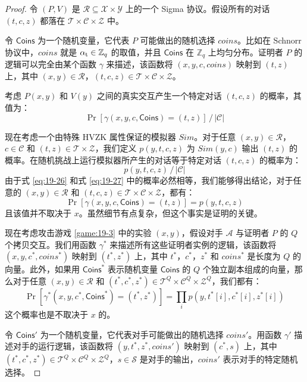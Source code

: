 \begin{proof}
令 $(P,V)$ 是 $\mathcal{R}\subseteq\mathcal{X}×\mathcal{Y}$ 上的一个 Sigma 协议。假设所有的对话 $(t,c,z)$ 都落在 $\mathcal{T}\times\mathcal{C}\times\mathcal{Z}$ 中。

令 $\mathsf{Coins}$ 为一个随机变量，它代表 $P$ 可能做出的随机选择 $coins$。比如在 Schnorr 协议中，$coins$ 就是 $\alpha_{\rm t}\in\mathbb{Z}_q$ 的取值，并且 $\mathsf{Coins}$ 在 $\mathbb{Z}_q$ 上均匀分布。证明者 $P$ 的逻辑可以完全由某个函数 $\gamma$ 来描述，该函数将 $(x,y,c,coins)$ 映射到 $(t,z)$ 上，其中 $(x,y)\in\mathcal{R}$，$(t,c,z)\in\mathcal{T}\times\mathcal{C}\times\mathcal{Z}$。

考虑 $P(x,y)$ 和 $V(y)$ 之间的真实交互产生一个特定对话 $(t,c,z)$ 的概率，其值为：
\begin{equation}\label{eq:19-26}
{\Pr[\gamma(x,y,c,\mathsf{Coins})=(t,z)]}\,/\,{|\mathcal{C}|}
\end{equation}


现在考虑一个由特殊 HVZK 属性保证的模拟器 $Sim$。对于任意 $(x,y)\in\mathcal{R}$，$c\in\mathcal{C}$ 和 $(t,z)\in\mathcal{T}\times\mathcal{Z}$，我们定义 $p(y,t,c,z)$ 为 $Sim(y,c)$ 输出 $(t,z)$ 的概率。在随机挑战上运行模拟器所产生的对话等于特定对话 $(t,c,z)$ 的概率为：
\begin{equation}\label{eq:19-27}
{p(y,t,c,z)}\,/\,{|\mathcal{C}|}
\end{equation}
由于式 \ref{eq:19-26} 和式 \ref{eq:19-27} 中的概率必然相等，我们能够得出结论，对于任意的 $(x,y)\in\mathcal{R}$ 和 $(t,c,z)\in\mathcal{T}\times\mathcal{C}\times\mathcal{Z}$，都有：
\[
\Pr[\gamma(x,y,c,\mathsf{Coins})=(t,z)]=p(y,t,c,z)
\]
且该值并不取决于 $x$。虽然细节有点复杂，但这个事实是证明的关键。

现在考虑攻击游戏 \ref{game:19-3} 中的实验 $(x,y)$，假设对手 $\mathcal{A}$ 与证明者 $P$ 的 $Q$ 个拷贝交互。我们用函数 $\gamma^*$ 来描述所有这些证明者实例的逻辑，该函数将 $(x,y,c^*,coins^*)$ 映射到 $(t^*,z^*)$ 上，其中 $t^*$，$c^*$，$z^*$ 和 $coins^*$ 是长度为 $Q$ 的向量。此外，如果用 $\mathsf{Coins}^*$ 表示随机变量 $\mathsf{Coins}$ 的 $Q$ 个独立副本组成的向量，那么对于任意 $(x,y)\in\mathcal{R}$ 和 $(t^*,c^*,z^*)\in\mathcal{T}^Q\times\mathcal{C}^Q\times\mathcal{Z}^Q$，我们都有：
\[
\Pr[\gamma^*(x,y,c^*,\mathsf{Coins}^*)=(t^*,z^*)]=\prod_{i}p(y,t^*[i],c^*[i], z^*[i])
\]
这个概率也是不取决于 $x$ 的。

令 $\mathsf{Coins}'$ 为一个随机变量，它代表对手可能做出的随机选择 $coins'$。用函数 $\gamma'$ 描述对手的运行逻辑，该函数将 $(y,t^*,z^*,coins')$ 映射到 $(c^*,s)$ 上，其中 $(t^*,c^*,z^*)\in\mathcal{T}^Q\times\mathcal{C}^Q\times\mathcal{Z}^Q$，$s\in\mathcal{S}$ 是对手的输出，$coins'$ 表示对手的特定随机选择。


\end{proof}
